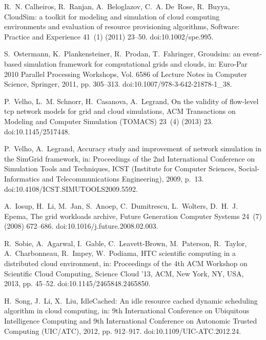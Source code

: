 \documentclass[sort, compress, 5p]{elsarticle}
\begin{document}
\begin{thebibliography}{10}
R.~N. Calheiros, R.~Ranjan, A.~Beloglazov, C.~A. De~Rose, R.~Buyya, {CloudSim}:
  a toolkit for modeling and simulation of cloud computing environments and
  evaluation of resource provisioning algorithms, Software: Practice and
  Experience 41~(1) (2011) 23--50.
\newblock doi:10.1002/spe.995.

S.~Ostermann, K.~Plankensteiner, R.~Prodan, T.~Fahringer, Groudsim: an
  event-based simulation framework for computational grids and clouds, in:
  Euro-Par 2010 Parallel Processing Workshops, Vol. 6586 of Lecture Notes in
  Computer Science, Springer, 2011, pp. 305--313.
\newblock doi:10.1007/978-3-642-21878-1\_38.

P.~Velho, L.~M. Schnorr, H.~Casanova, A.~Legrand, On the validity of flow-level
  tcp network models for grid and cloud simulations, ACM Transactions on
  Modeling and Computer Simulation (TOMACS) 23~(4) (2013) 23.
\newblock doi:10.1145/2517448.

P.~Velho, A.~Legrand, Accuracy study and improvement of network simulation in
  the {SimGrid} framework, in: Proceedings of the 2nd International Conference
  on Simulation Tools and Techniques, ICST (Institute for Computer Sciences,
  Social-Informatics and Telecommunications Engineering), 2009, p.~13.
\newblock doi:10.4108/ICST.SIMUTOOLS2009.5592.

A.~Iosup, H.~Li, M.~Jan, S.~Anoep, C.~Dumitrescu, L.~Wolters, D.~H.~J. Epema,
  The grid workloads archive, Future Generation Computer Systems 24~(7) (2008)
  672--686.
\newblock doi:10.1016/j.future.2008.02.003.

R.~Sobie, A.~Agarwal, I.~Gable, C.~Leavett-Brown, M.~Paterson, R.~Taylor,
  A.~Charbonneau, R.~Impey, W.~Podiama, {HTC} scientific computing in a
  distributed cloud environment, in: Proceedings of the 4th ACM Workshop on
  Scientific Cloud Computing, Science Cloud '13, ACM, New York, NY, USA, 2013,
  pp. 45--52.
\newblock doi:10.1145/2465848.2465850.

H.~Song, J.~Li, X.~Liu, {IdleCached}: An idle resource cached dynamic
  scheduling algorithm in cloud computing, in: 9th International Conference on
  Ubiquitous Intelligence Computing and 9th International Conference on
  Autonomic Trusted Computing (UIC/ATC), 2012, pp. 912--917.
\newblock doi:10.1109/UIC-ATC.2012.24.


\end{thebibliography}
\end{document}
